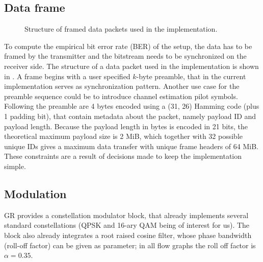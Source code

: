 \subsection{Data frame} \label{sec:data-frame}

\begin{figure}
\centering

	\caption{
		Structure of framed data packets used in the implementation.
		\label{fig:dataframe}
	}
\end{figure}

To compute the empirical bit error rate (BER) of the setup, the data has to be framed by the transmitter and the bitstream needs to be synchronized on the receiver side. The structure of a data packet used in the implementation is shown in . A frame begins with a user specified \(k\)-byte preamble, that in the current implementation serves as synchronization pattern. Another use case for the preamble sequence could be to introduce channel estimation pilot symbols. Following the preamble are 4 bytes encoded using a (31, 26) Hamming code (plus 1 padding bit), that contain metadata about the packet, namely payload ID and payload length. Because the payload length in bytes is encoded in 21 bits, the theoretical maximum payload size is 2 MiB, which together with 32 possible unique IDs gives a maximum data transfer with unique frame headers of 64 MiB. These constraints are a result of decisions made to keep the implementation simple. %


\subsection{Modulation}

GR provides a constellation modulator block, that already implements several standard constellations (QPSK and 16-ary QAM being of interest for us). The block also already integrates a root raised cosine filter, whose phase bandwidth (roll-off factor) can be given as parameter; in all flow graphs the roll off factor is \(\alpha = 0.35\).

%

